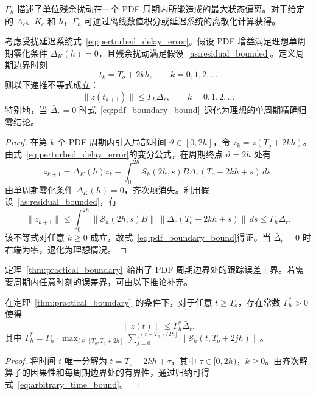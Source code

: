 \(\Gamma_h\) 描述了单位残余扰动在一个 PDF 周期内所能造成的最大状态偏离。对于给定的 \(A_c\)、\(K_c\) 和 \(h\)，\(\Gamma_h\) 可通过离线数值积分或延迟系统的离散化计算获得。

\begin{theorem}[周期边界实际有界跟踪]\label{thm:practical_boundary}
  考虑受扰延迟系统式~\eqref{eq:perturbed_delay_error}。假设 PDF 增益满足理想单周期零化条件 \(\Delta_K(h)=0\)，且残余扰动满足假设~\ref{as:residual_bounded}。定义周期边界时刻
  \[
  t_k = T_o + 2kh,\qquad k=0,1,2,\ldots
  \]
  则以下递推不等式成立：
  \begin{equation}
  \|z(t_{k+1})\| \le \Gamma_h\bar\Delta_r,\qquad k=0,1,2,\ldots
  \label{eq:pdf_boundary_bound}
  \end{equation}
  特别地，当 \(\bar\Delta_r=0\) 时式~\eqref{eq:pdf_boundary_bound}~退化为理想的单周期精确归零结论。
\end{theorem}

\begin{proof}
  在第 \(k\) 个 PDF 周期内引入局部时间 \(\vartheta\in[0,2h]\)，令 \(z_k = z(T_o+2kh)\)。由式~\eqref{eq:perturbed_delay_error}的变分公式，在周期终点 \(\vartheta=2h\) 处有
  \[
  z_{k+1} = \Delta_K(h)z_k + \int_0^{2h} \mathcal S_h(2h,s) B\Delta_r(T_o+2kh+s)\,ds.
  \]
  由单周期零化条件 \(\Delta_K(h)=0\)，齐次项消失。利用假设~\ref{as:residual_bounded}，有
  \[
  \|z_{k+1}\|
  \le \int_0^{2h} \bigl\|\mathcal S_h(2h,s)B\bigr\|\,\|\Delta_r(T_o+2kh+s)\|\,ds
  \le \Gamma_h\bar\Delta_r.
  \]
  该不等式对任意 \(k\ge 0\) 成立，故式~\eqref{eq:pdf_boundary_bound}得证。当 \(\bar\Delta_r=0\) 时右端为零，退化为理想情况。
\end{proof}

定理~\ref{thm:practical_boundary}~给出了 PDF 周期边界处的跟踪误差上界。若需要周期内任意时刻的误差界，可由以下推论补充。

\begin{corollary}[周期内任意时刻有界跟踪]\label{cor:arbitrary_time}
  在定理~\ref{thm:practical_boundary}~的条件下，对于任意 \(t\ge T_o\)，存在常数 \(\Gamma_h^*>0\) 使得
  \begin{equation}
  \|z(t)\| \le \Gamma_h^*\bar\Delta_r.
  \label{eq:arbitrary_time_bound}
  \end{equation}
  其中 \(\Gamma_h^* = \Gamma_h \cdot \max_{t\in[T_o,T_o+2h]} \sum_{j=0}^{\lfloor (t-T_o)/2h\rfloor} \|\mathcal S_h(t,T_o+2jh)\|\)。
\end{corollary}

\begin{proof}
  将时间 \(t\) 唯一分解为 \(t = T_o + 2k h + \tau\)，其中 \(\tau\in[0,2h)\)，\(k\ge 0\)。由齐次解算子的因果性和每周期边界处的有界性，通过归纳可得式~\eqref{eq:arbitrary_time_bound}。
\end{proof}

